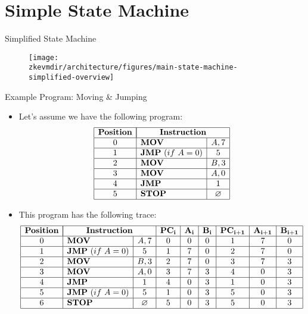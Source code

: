 
\section{Simple State Machine}

\begin{frame}{Simplified State Machine}
\begin{figure}
	\texttt{[image: \\zkevmdir/architecture/figures/main-state-machine-simplified-overview]}
\end{figure}
\end{frame}









\begin{frame}[allowframebreaks]{Example Program: Moving \& Jumping}
\begin{itemize}
\item Let's assume we have the following program:
\[
\begin{array}{|c|l|c|}
\hline
\mathbf{Position} & \multicolumn{2}{|c|}{\mathbf{Instruction}} \\ \hline
0 & \mathbf{MOV} & A, 7 \\ \hline
1 & \mathbf{JMP}~(if~A = 0) & 5 \\ \hline
2 & \mathbf{MOV} & B, 3 \\ \hline
3 & \mathbf{MOV} & A, 0 \\ \hline
4 & \mathbf{JMP} & 1 \\ \hline
5 & \mathbf{STOP} & \emptyset \\ \hline
\end{array}
\]

\item This program has the following trace:
\[
\begin{array}{|c|l|c|c|c|c|c|c|c|}
\hline
\mathbf{Position} & \multicolumn{2}{|c|}{\mathbf{Instruction}} & \mathbf{PC_i} & \mathbf{A_i} & \mathbf{B_i} & \mathbf{PC_{i+1}} & \mathbf{A_{i+1}} & \mathbf{B_{i+1}} \\ \hline
0 & \mathbf{MOV} & A, 7 & 0 & 0 & 0 & 1 & 7 & 0 \\ \hline
1 & \mathbf{JMP}~(if~A = 0) & 5 & 1 & 7 & 0 & 2 & 7 & 0 \\ \hline
2 & \mathbf{MOV} & B, 3 & 2 & 7 & 0 & 3 & 7 & 3 \\ \hline
3 & \mathbf{MOV} & A, 0 & 3 & 7 & 3 & 4 & 0 & 3 \\ \hline
4 & \mathbf{JMP} & 1 & 4 & 0 & 3 & 1 & 0 & 3 \\ \hline
5 & \mathbf{JMP}~(if~A = 0) & 5 & 1 & 0 & 3 & 5 & 0 & 3 \\ \hline
6 & \mathbf{STOP} & \emptyset & 5 & 0 & 3 & 5 & 0 & 3 \\ \hline
\end{array}
\]
\end{itemize}
\end{frame}






